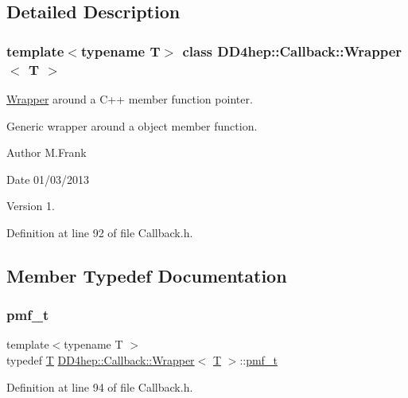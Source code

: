 \subsection{Detailed Description}
\subsubsection*{template$<$typename T$>$\newline
class D\+D4hep\+::\+Callback\+::\+Wrapper$<$ T $>$}

\hyperlink{class_d_d4hep_1_1_callback_1_1_wrapper}{Wrapper} around a C++ member function pointer. 

Generic wrapper around a object member function.

\begin{DoxyAuthor}{Author}
M.\+Frank 
\end{DoxyAuthor}
\begin{DoxyDate}{Date}
01/03/2013 
\end{DoxyDate}
\begin{DoxyVersion}{Version}
1. 
\end{DoxyVersion}


Definition at line 92 of file Callback.\+h.



\subsection{Member Typedef Documentation}
\hypertarget{class_d_d4hep_1_1_callback_1_1_wrapper_ab266379df9f395d1221b2adbf62b112c}{}\label{class_d_d4hep_1_1_callback_1_1_wrapper_ab266379df9f395d1221b2adbf62b112c} 
\subsubsection{\texorpdfstring{pmf\+\_\+t}{pmf\_t}}
{\footnotesize\ttfamily template$<$typename T $>$ \\
typedef \hyperlink{class_t}{T} \hyperlink{class_d_d4hep_1_1_callback_1_1_wrapper}{D\+D4hep\+::\+Callback\+::\+Wrapper}$<$ \hyperlink{class_t}{T} $>$\+::\hyperlink{class_d_d4hep_1_1_callback_1_1_wrapper_ab266379df9f395d1221b2adbf62b112c}{pmf\+\_\+t}}



Definition at line 94 of file Callback.\+h.




